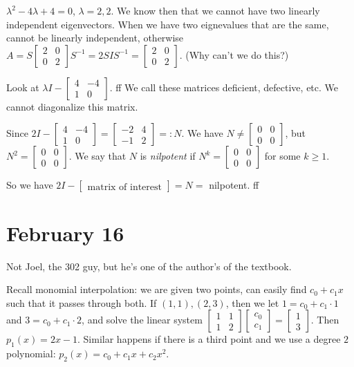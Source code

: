 \documentclass{article}
\theoremstyle{plain}
\theoremstyle{remark}
\begin{document}
$\lambda^2 - 4\lambda + 4 = 0$, $\lambda = 2,2$.
We know then that we cannot have two linearly independent eigenvectors.
When we have two eignevalues that are the same,
cannot be linearly independent, otherwise
$A = S\begin{bmatrix} 2 & 0 \\ 0 & 2 \end{bmatrix} S^{-1}
= 2SIS^{-1} = \begin{bmatrix} 2 & 0 \\ 0 & 2 \end{bmatrix}$.
(Why can't we do this?)

Look at $\lambda I - \begin{bmatrix} 4 & -4 \\ 1 & 0 \end{bmatrix}$.
ff
We call these matrices deficient, defective, etc.
We cannot diagonalize this matrix.

Since $2I - \begin{bmatrix} 4 & -4 \\ 1 & 0 \end{bmatrix} =
\begin{bmatrix} -2 & 4 \\ -1 & 2 \end{bmatrix} =: N$.
We have $N \neq \begin{bmatrix} 0 & 0 \\ 0 & 0 \end{bmatrix}$,
but $N^2 = \begin{bmatrix} 0 & 0 \\ 0 & 0 \end{bmatrix}$.
We say that $N$ is \emph{nilpotent}
if $N^k = \begin{bmatrix} 0 & 0 \\ 0 & 0 \end{bmatrix}$ for some $k \geq 1$.

So we have $2I - \begin{bmatrix} \text{matrix of interest}\end{bmatrix} = N = $ nilpotent.
ff


\section{February 16}
Not Joel, the 302 guy, but he's one of the author's of the textbook.

Recall monomial interpolation:
we are given two points, can easily find $c_0 + c_1x$ such that it passes through both.
If $(1,1),(2,3)$, then we let $1 = c_0 + c_1\cdot 1$ and $3 = c_0 + c_1\cdot2$,
and solve the linear system $\begin{bmatrix} 1 & 1 \\ 1 & 2 \end{bmatrix}
\begin{bmatrix} c_0 \\ c_1 \end{bmatrix} = \begin{bmatrix} 1 \\ 3 \end{bmatrix}$.
Then $p_1(x) = 2x - 1$.
Similar happens if there is a third point and we use a degree $2$ polynomial:
$p_2(x) = c_0 + c_1x + c_2x^2$.
\end{document}
